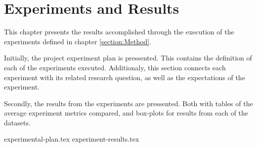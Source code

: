 \chapter{Experiments and Results}
\label{section:Results}

This chapter presents the results accomplished through the execution of the experiments defined in chapter \cref{section:Method}.

Initially, the project experiment plan is pressented.
This contains the definition of each of the experiments executed.
Additionaly, this section connects each experiment with its related research question,
as well as the expectations of the experiment. 

Secondly, the results from the experiments are pressented.
Both with tables of the average experiment metrics compared, and box-plots for results from each of the datasets.


{experimental-plan.tex}
{experiment-results.tex}




\iffalse

  \section{Experimental Setup}
  \label{sec:experimentalSetup}

  The experimental setup should include all data - parameters etc, that would allow a person to repeat your experiments.

  \section{Experimental Results}
  \label{sec:experimentalResults}

  Results should be clearly displayed and should provide a suitable representation of your results for the points you wish to make. Graphs should be labeled in a legible font and if more than one result is displayed on the same graph then these should be clearly marked.   Please choose carefully rather than presenting every results. Too much information is hard to read and often hides the key information you wish to present. Make use of statistical methods when presenting results, where possible to strengthen the results.  Further, the format of the presentation of results should be chosen based on what issues in the results you wish to highlight. You may wish to present a subset in the experimental section and provide additional results in the appendix.
\fi